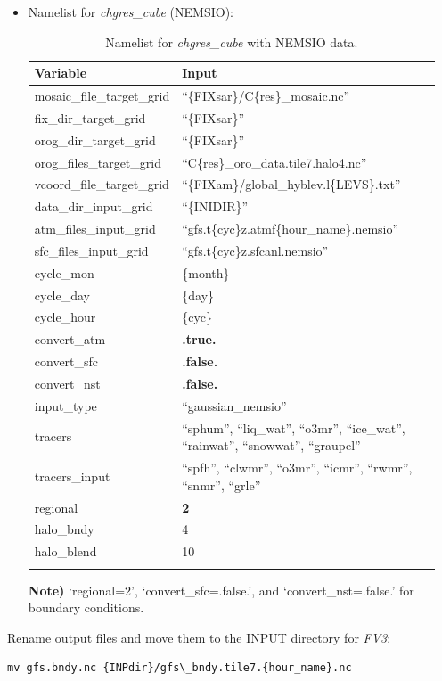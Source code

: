 \documentclass[11pt,fleqn]{report}              %
\begin{document}
\begin{itemize}
\item Namelist for {\it chgres\_cube} (NEMSIO):
{
\fontsize{9}{11}\selectfont
\begin{longtable}{ p{0.23\linewidth} | p{0.72\linewidth} }
\hline
\hline
 Variable & Input \\
\hline
 mosaic\_file\_target\_grid  & ``\{FIXsar\}/C\{res\}\_mosaic.nc''  \\
 fix\_dir\_target\_grid & ``\{FIXsar\}'' \\
 orog\_dir\_target\_grid & ``\{FIXsar\}'' \\
 orog\_files\_target\_grid & ``C\{res\}\_oro\_data.tile7.halo4.nc'' \\
 vcoord\_file\_target\_grid & ``\{FIXam\}/global\_hyblev.l\{LEVS\}.txt'' \\
 data\_dir\_input\_grid & ``\{INIDIR\}''\\
 atm\_files\_input\_grid & ``gfs.t\{cyc\}z.atmf\{hour\_name\}.nemsio'' \\
 sfc\_files\_input\_grid & ``gfs.t\{cyc\}z.sfcanl.nemsio'' \\
 cycle\_mon & \{month\} \\
 cycle\_day & \{day\}  \\
 cycle\_hour & \{cyc\} \\
 convert\_atm & {\bf .true.} \\
 convert\_sfc & {\bf .false.} \\
 convert\_nst & {\bf .false.} \\
 input\_type & ``gaussian\_nemsio'' \\
 tracers &``sphum'', ``liq\_wat'', ``o3mr'', ``ice\_wat'', ``rainwat'', ``snowwat'', ``graupel'' \\
 tracers\_input & ``spfh'', ``clwmr'', ``o3mr'', ``icmr'', ``rwmr'', ``snmr'', ``grle'' \\
 regional & {\bf 2} \\
 halo\_bndy & 4 \\
 halo\_blend & 10 \\
\hline
\caption{Namelist for {\it chgres\_cube} with NEMSIO data.}
\label{table:namelist_ic_chgres}
\end{longtable}
}

{\bf Note)} `regional=2', `convert\_sfc=.false.', and `convert\_nst=.false.' for boundary conditions.

\end{itemize} 

Rename output files and move them to the INPUT directory for {\it FV3}:
\lstset{language=bash}   
\begin{lstlisting}[frame=trBL]
mv gfs.bndy.nc {INPdir}/gfs\_bndy.tile7.{hour_name}.nc
\end{lstlisting}
\end{document}
